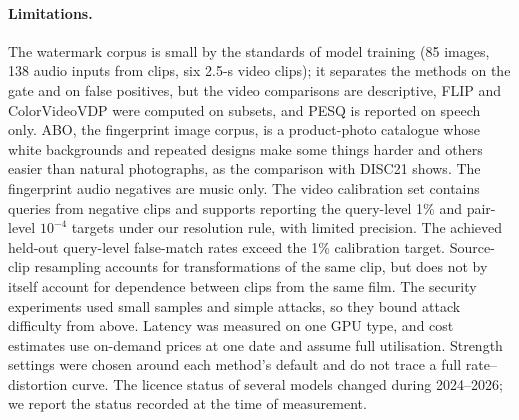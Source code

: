 \paragraph{Limitations.} The watermark corpus is small by the standards of model training (85 images, 138 audio inputs from  clips, six 2.5-s video clips); it separates the methods on the gate and on false positives, but the video comparisons are descriptive, FLIP and ColorVideoVDP were computed on subsets, and PESQ is reported on speech only. ABO, the fingerprint image corpus, is a product-photo catalogue whose white backgrounds and repeated designs make some things harder and others easier than natural photographs, as the comparison with DISC21 shows. The fingerprint audio negatives are music only. The video calibration set contains  queries from  negative clips and supports reporting the query-level 1\% and pair-level $10^{-4}$ targets under our resolution rule, with limited precision. The achieved held-out query-level false-match rates exceed the 1\% calibration target. Source-clip resampling accounts for transformations of the same clip, but does not by itself account for dependence between clips from the same film. The security experiments used small samples and simple attacks, so they bound attack difficulty from above. Latency was measured on one GPU type, and cost estimates use on-demand prices at one date and assume full utilisation. Strength settings were chosen around each method's default and do not trace a full rate--distortion curve. The licence status of several models changed during 2024--2026; we report the status recorded at the time of measurement.
